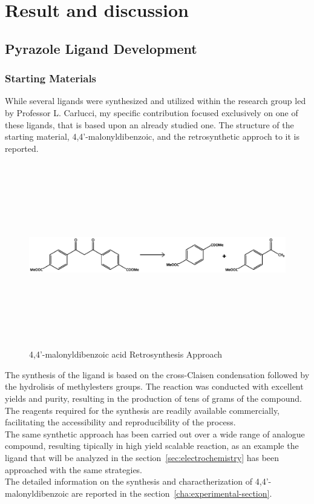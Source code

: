 \documentclass[../Master.tex]{subfiles}
\begin{document}
\chapter{Result and discussion}

\section{Pyrazole Ligand Development}\label{sec:pyr-dev}

\subsection{Starting Materials}\label{sec:starting-materials}

While several ligands were synthesized and utilized within the research group led by Professor L. Carlucci, my specific contribution focused exclusively on one of these ligands, that is based upon an already studied one. The structure of the starting material, 4,4’-malonyldibenzoic, and the retrosynthetic approch to it is reported.

\begin{figure}[h]
	\centering
	\includegraphics[width=16cm,height=8cm,keepaspectratio]{Structures/dikest2-retro.eps}
	\caption{4,4’-malonyldibenzoic acid Retrosynthesis Approach}\label{fig:dikest2-retro}
\end{figure}

The synthesis of the ligand is based on the cross-Claisen condensation followed by the hydrolisis of methylesters groups. The reaction was conducted with excellent yields and purity, resulting in the production of tens of grams of the compound. The reagents required for the synthesis are readily available commercially, facilitating the accessibility and reproducibility of the process. \\
The same synthetic approach has been carried out over a wide range of analogue compound, resulting tipically in high yield scalable reaction, as an example the ligand that will be analyzed in the section\ \ref{sec:electrochemistry} has been approached with the same strategies.\\
The detailed information on the synthesis and charactherization of 4,4’-malonyldibenzoic are reported in the section\ \ref{cha:experimental-section}.
\newpage
\end{document}
